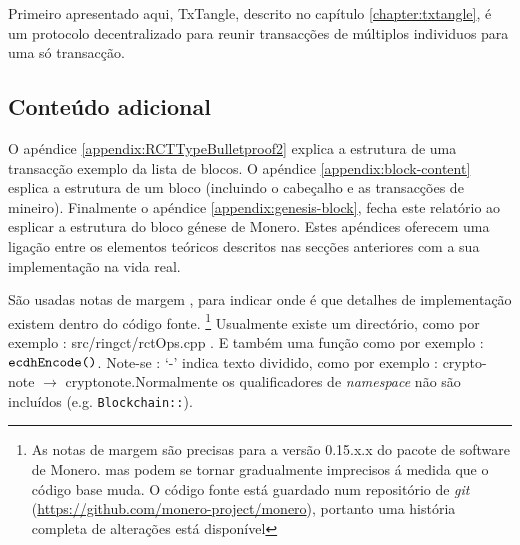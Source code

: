 Primeiro apresentado aqui, TxTangle, descrito no capítulo \ref{chapter:txtangle}, é um protocolo decentralizado para reunir transacções de múltiplos individuos para uma só transacção.



\subsection{Conteúdo adicional}

O apéndice \ref{appendix:RCTTypeBulletproof2} explica a estrutura de uma transacção exemplo da lista de blocos. O apéndice \ref{appendix:block-content} esplica a estrutura de um bloco (incluindo o cabeçalho e as transacções de mineiro). Finalmente o apéndice \ref{appendix:genesis-block}, fecha este relatório ao esplicar a estrutura do bloco génese de Monero. Estes apéndices oferecem uma ligação entre os elementos teóricos descritos nas secções anteriores com a sua implementação na vida real.
    

São usadas notas de margem , para indicar onde é que detalhes de implementação existem dentro do código fonte. 
\footnote{As notas de margem são precisas para a versão 0.15.x.x do pacote de software de Monero. mas podem se tornar gradualmente imprecisos á medida que o código base muda. O código fonte está guardado num repositório de {\em git} (\url{https://github.com/monero-project/monero}), portanto uma história completa de alterações está disponível}
Usualmente existe um directório, como por exemplo : src/ringct/rctOps.cpp . E também uma função como por exemplo : \(\textrm{{\tt ecdhEncode()}}\). Note-se : `-' indica texto dividido, como por exemplo : crypto- note $\rightarrow$ cryptonote.\newline Normalmente os qualificadores de {\em namespace} não são incluídos (e.g. {\tt Blockchain::}).


